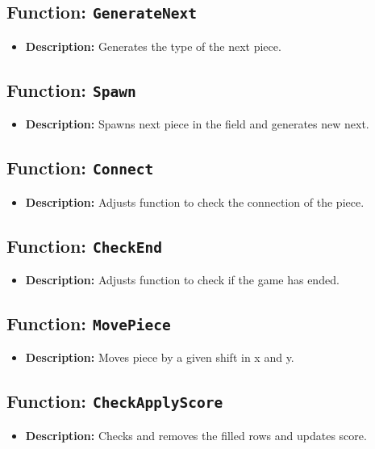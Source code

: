 \documentclass{article}
\begin{document}
\subsection{Function: \texttt{GenerateNext}}
\begin{itemize}
    \item \textbf{Description:} Generates the type of the next piece.
\end{itemize}

\subsection{Function: \texttt{Spawn}}
\begin{itemize}
    \item \textbf{Description:} Spawns next piece in the field and generates new next.
\end{itemize}

\subsection{Function: \texttt{Connect}}
\begin{itemize}
    \item \textbf{Description:} Adjusts function to check the connection of the piece.
\end{itemize}

\subsection{Function: \texttt{CheckEnd}}
\begin{itemize}
    \item \textbf{Description:} Adjusts function to check if the game has ended.
\end{itemize}

\subsection{Function: \texttt{MovePiece}}
\begin{itemize}
    \item \textbf{Description:} Moves piece by a given shift in x and y.
\end{itemize}

\subsection{Function: \texttt{CheckApplyScore}}
\begin{itemize}
    \item \textbf{Description:} Checks and removes the filled rows and updates score.
\end{itemize}
\end{document}
